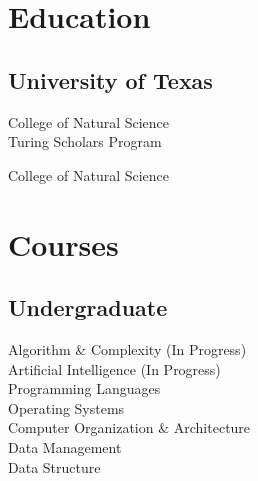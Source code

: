 \documentclass[]{deedy-resume-openfont}
\begin{document}
%
%

%
%



%
%

\begin{minipage}[t]{0.33\textwidth} 


\section{Education} 

\subsection{University of Texas}

\vspace{\topsep} %

College of Natural Science \\
Turing Scholars Program \\
\sectionsep

College of Natural Science \\
\sectionsep




\section{Courses}

\subsection{Undergraduate}
Algorithm \& Complexity (In Progress) \\
Artificial Intelligence (In Progress) \\
Programming Languages \\
Operating Systems \\
Computer Organization \& Architecture \\
Data Management \\
Data Structure \\


\end{minipage}
\end{document}
